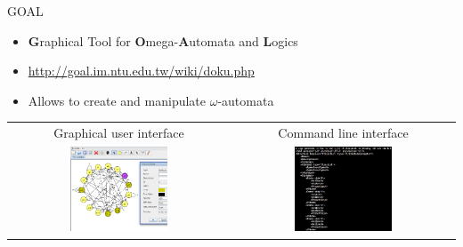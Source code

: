 \documentclass[12pt]{beamer}
\newcommand{\fat}[1]{\textbf{#1}}
\begin{document}
\begin{frame}{GOAL}
\begin{itemize}\itemsep4pt
\item \fat{G}raphical Tool for \fat{O}mega-\fat{A}utomata and \fat{L}ogics
\item \url{http://goal.im.ntu.edu.tw/wiki/doku.php}
\item Allows to create and manipulate $\omega$-automata
\end{itemize}
\vspace{0.05cm}
\centering
\begin{tabular}{cc}
\footnotesize Graphical user interface & \footnotesize Command line interface \\
\includegraphics[width=0.46\textwidth,trim={0 2cm 0 0},clip]
{figures/goal_gui.png} &
\includegraphics[width=0.46\textwidth,trim={0 2cm 0 0},clip]
{figures/goal_cl.png}
\end{tabular}
\end{frame}
\end{document}
